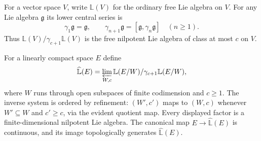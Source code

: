 \documentclass[10pt,a4paper]{amsart}
\newcommand{\LL}{\widehat{\mathbb L}}
\begin{document}
For a vector space $V$, write $\mathbb L(V)$ for the ordinary free Lie
algebra on $V$.  For any Lie algebra $\mathfrak g$ its lower central series is
\[
 \gamma_1\mathfrak g=\mathfrak g,\qquad
 \gamma_{n+1}\mathfrak g=[\mathfrak g,\gamma_n\mathfrak g]
 \quad(n\geq1).
\]
Thus $\mathbb L(V)/\gamma_{c+1}\mathbb L(V)$ is the free nilpotent Lie
algebra of class at most $c$ on $V$.

For a linearly compact space $E$ define
\begin{equation}\label{eq:free-lie}
 \LL(E)=\varprojlim_{W,c}
 \mathbb L(E/W)/\gamma_{c+1}\mathbb L(E/W),
\end{equation}
where $W$ runs through open subspaces of finite codimension and $c\geq1$.
The inverse system is ordered by refinement: $(W',c')$ maps to $(W,c)$
whenever $W'\subseteq W$ and $c'\geq c$, via the evident quotient map.
Every displayed factor is a finite-dimensional nilpotent Lie algebra.
The canonical map $E\to\LL(E)$ is continuous, and its image
topologically generates $\LL(E)$.
\end{document}
